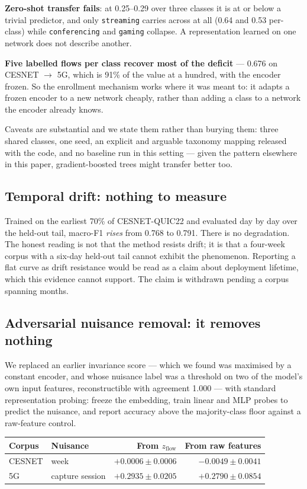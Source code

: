 \textbf{Zero-shot transfer fails}: at 0.25--0.29 over three classes it is at or
below a trivial predictor, and only \texttt{streaming} carries across at all
(0.64 and 0.53 per-class) while \texttt{conferencing} and \texttt{gaming}
collapse. A representation learned on one network does not describe another.

\textbf{Five labelled flows per class recover most of the deficit} --- 0.676 on
CESNET $\rightarrow$ 5G, which is 91\% of the value at a hundred, with the
encoder frozen. So the enrollment mechanism works where it was meant to: it
adapts a frozen encoder to a new network cheaply, rather than adding a class to
a network the encoder already knows.

Caveats are substantial and we state them rather than burying them: three
shared classes, one seed, an explicit and arguable taxonomy mapping released
with the code, and no baseline run in this setting --- given the pattern
elsewhere in this paper, gradient-boosted trees might transfer better too.

\subsection{Temporal drift: nothing to measure}

Trained on the earliest 70\% of CESNET-QUIC22 and evaluated day by day over the
held-out tail, macro-F1 \emph{rises} from 0.768 to 0.791. There is no
degradation. The honest reading is not that the method resists drift; it is
that a four-week corpus with a six-day held-out tail cannot exhibit the
phenomenon. Reporting a flat curve as drift resistance would be read as a claim
about deployment lifetime, which this evidence cannot support. The claim is
withdrawn pending a corpus spanning months.

\subsection{Adversarial nuisance removal: it removes nothing}

We replaced an earlier invariance score --- which we found was maximised by a
constant encoder, and whose nuisance label was a threshold on two of the
model's own input features, reconstructible with agreement 1.000 --- with
standard representation probing: freeze the embedding, train linear and MLP
probes to predict the nuisance, and report accuracy above the majority-class
floor against a raw-feature control.

\begin{center}
\small
\begin{tabular}{llrr}
\toprule
Corpus & Nuisance & From $z_{\mathrm{flow}}$ & From raw features \\
\midrule
CESNET & week & $+0.0006 \pm 0.0006$ & $-0.0049 \pm 0.0041$ \\
5G & capture session & $+0.2935 \pm 0.0205$ & $+0.2790 \pm 0.0854$ \\
\bottomrule
\end{tabular}
\end{center}

